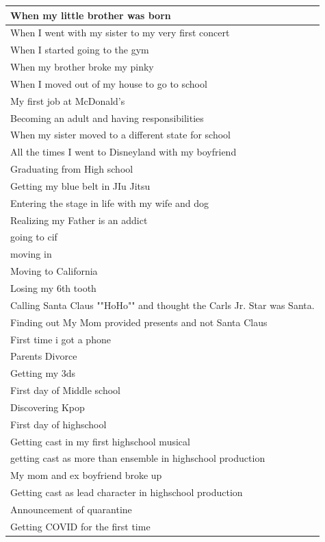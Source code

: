 \documentclass[
  .7em,
  letterpaper,
  DIV=11,
  numbers=noendperiod]{scrartcl}
\begin{document}
\begin{table}
\begin{tabular}{l}
\hline
When my little brother was born\\
\hline
When I went with my sister to my very first concert\\
\hline
When I started going to the gym\\
\hline
When my brother broke my pinky\\
\hline
When I moved out of my house to go to school\\
\hline
My first job at McDonald’s\\
\hline
Becoming an adult and having responsibilities\\
\hline
When my sister moved to a different state for school\\
\hline
All the times I went to Disneyland with my boyfriend\\
\hline
Graduating from High school\\
\hline
Getting my blue belt in JIu Jitsu\\
\hline
Entering the stage in life with my wife and dog\\
\hline
Realizing my Father is an addict\\
\hline
going to cif\\
\hline
moving in\\
\hline
Moving to California\\
\hline
Losing my 6th tooth\\
\hline
Calling Santa Claus ""HoHo"" and thought the Carls Jr. Star was Santa.\\
\hline
Finding out My Mom provided presents and not Santa Claus\\
\hline
First time i got a phone\\
\hline
Parents Divorce\\
\hline
Getting my 3ds\\
\hline
First day of Middle school\\
\hline
Discovering Kpop\\
\hline
First day of highschool\\
\hline
Getting cast in my first highschool musical\\
\hline
getting cast as more than ensemble in highschool production\\
\hline
My mom and ex boyfriend broke up\\
\hline
Getting cast as lead character in highschool production\\
\hline
Announcement of quarantine\\
\hline
Getting COVID for the first time\\

\end{tabular}
\end{table}
\end{document}
